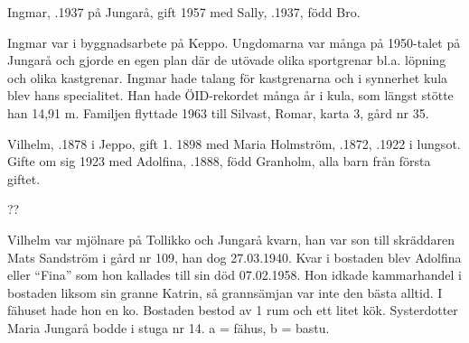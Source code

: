 Ingmar, .1937 på Jungarå, gift 1957 med Sally, .1937, född Bro.
\begin{jhchildren}
  \item {}
  \item {}
  \item {}
  \item {}
  \item {}
\end{jhchildren}
Ingmar var i byggnadsarbete på Keppo. Ungdomarna var många på 1950-talet på Jungarå och gjorde en egen plan där de utövade olika sportgrenar bl.a. löpning och olika kastgrenar. Ingmar hade talang för kastgrenarna och i synnerhet kula blev hans specialitet. Han hade ÖID-rekordet många år i kula, som längst stötte han 14,91 m. Familjen flyttade 1963 till Silvast, Romar, karta 3, gård nr 35.


Vilhelm, .1878 i Jeppo, gift 1. 1898 med Maria Holmström, .1872, .1922 i lungsot. Gifte om sig 1923 med Adolfina, .1888, född Granholm, alla barn från första giftet.
\begin{jhchildren}
  \item {}
  \item {}
  \item {}
  \item {}
  \item {} ??
  \item {}
\end{jhchildren}
Vilhelm var mjölnare på Tollikko och Jungarå kvarn, han var son till skräddaren Mats Sandström i gård nr 109, han dog 27.03.1940. Kvar i bostaden blev Adolfina eller ``Fina'' som hon kallades till sin död 07.02.1958. Hon idkade kammarhandel i bostaden liksom sin granne Katrin, så grannsämjan var inte den bästa alltid. I fähuset hade hon en ko. Bostaden bestod av 1 rum och ett litet kök. Systerdotter Maria Jungarå bodde i stuga nr 14. a = fähus, b = bastu.



